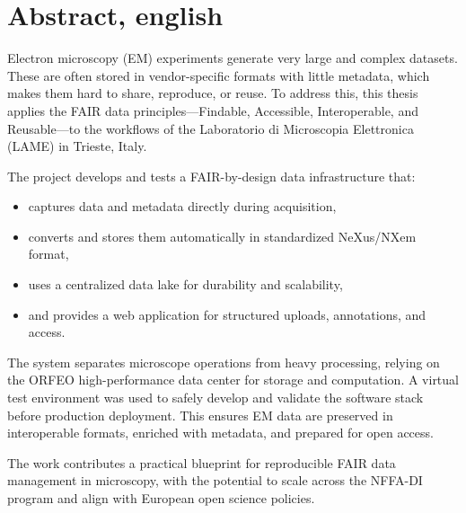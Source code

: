 \chapter{Abstract, english}

Electron microscopy (EM) experiments generate very large and complex datasets. These are often stored in vendor-specific formats with little metadata, which makes them hard to share, reproduce, or reuse. To address this, this thesis applies the FAIR data principles---Findable, Accessible, Interoperable, and Reusable---to the workflows of the Laboratorio di Microscopia Elettronica (LAME) in Trieste, Italy.

The project develops and tests a FAIR-by-design data infrastructure that:
\begin{itemize}
	\item captures data and metadata directly during acquisition,
	\item converts and stores them automatically in standardized NeXus/NXem format,
	\item uses a centralized data lake for durability and scalability,
	\item and provides a web application for structured uploads, annotations, and access.
\end{itemize}

The system separates microscope operations from heavy processing, relying on the ORFEO high-performance data center for storage and computation. A virtual test environment was used to safely develop and validate the software stack before production deployment. This ensures EM data are preserved in interoperable formats, enriched with metadata, and prepared for open access.

The work contributes a practical blueprint for reproducible FAIR data management in microscopy, with the potential to scale across the NFFA-DI program and align with European open science policies.